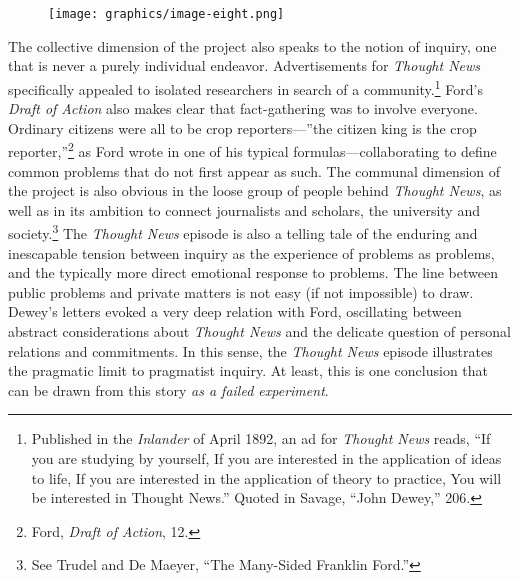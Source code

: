 \documentclass[openany,nobib]{tufte-book}
\begin{document}
\begin{figure}
   \texttt{[image: graphics/image-eight.png]}
   \label{fig:fig8}
\end{figure}


The collective dimension of the project also speaks to the notion of
inquiry, one that is never a purely individual endeavor. Advertisements
for \emph{Thought News} specifically appealed to isolated researchers in
search of a community.\footnote{Published in the \emph{Inlander} of
  April 1892, an ad for \emph{Thought News} reads, ``If you are studying
  by yourself, If you are interested in the application of ideas to
  life, If you are interested in the application of theory to practice,
  You will be interested in Thought News.'' Quoted in Savage, ``John
  Dewey,'' 206.} Ford's \emph{Draft of Action} also makes clear that
fact-gathering was to involve everyone. Ordinary citizens were all to be
crop reporters---''the citizen king is the crop reporter,''\footnote{Ford,
  \emph{Draft of Action}, 12.} as Ford wrote in one of his typical
formulas---collaborating to define common problems that do not first
appear as such. The communal dimension of the project is also obvious in
the loose group of people behind \emph{Thought News}, as well as in its
ambition to connect journalists and scholars, the university and
society.\footnote{See Trudel and De Maeyer, ``The Many-Sided Franklin
  Ford.''} The \emph{Thought News} episode is also a telling tale of the
enduring and inescapable tension between inquiry as the experience of
problems as problems, and the typically more direct emotional response
to problems. The line between public problems and private matters is not
easy (if not impossible) to draw. Dewey's letters evoked a very deep
relation with Ford, oscillating between abstract considerations about
\emph{Thought News} and the delicate question of personal relations and
commitments. In this sense, the \emph{Thought News} episode illustrates
the pragmatic limit to pragmatist inquiry. At least, this is one
conclusion that can be drawn from this story \emph{as a failed
experiment}.
\end{document}

